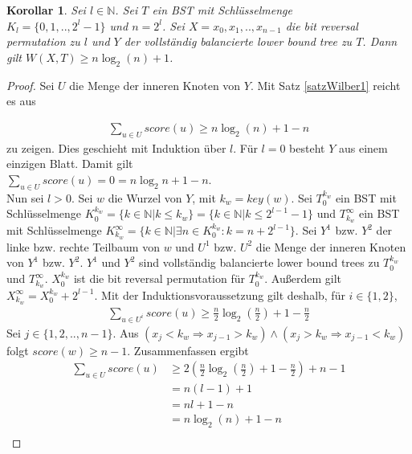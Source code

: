 \documentclass[a4paper,12pt]{article}
\begin{document}
\newtheorem{Korollar1}{Korollar}[section]
\begin{Korollar1} Sei $l \in \mathbb{N}$. Sei $T$ ein BST mit Schlüsselmenge\\ ${K_l = \{0,1,..,2^l -1\}}$ und $n = 2^l$. Sei $X = x_0, x_1,..,x_{n-1}$ die bit reversal permutation zu $l$ und $Y$ der vollständig balancierte lower bound tree zu $T$. Dann gilt  $W\left(X,T\right) \geq n \log_2 \left(n\right) + 1 $. 
\end{Korollar1}
\begin{proof}
	Sei $U$ die Menge der inneren Knoten von $Y$. Mit Satz \ref{satzWilber1} reicht es aus 
	
	\begin{align*}
	\sum_{u \in U} {\mathit{score}\left(u\right)} \geq n \log_2\left( n\right) + 1 - n 
	\end{align*} 
	zu zeigen. Dies geschieht mit Induktion über $l$. Für $l = 0$ besteht $Y$ aus einem einzigen Blatt. Damit gilt\\ $ \sum_{u \in U} {\mathit{score}\left(u\right)} = 0 = n \log_2 n + 1 - n $. \\
	Nun sei $l > 0$. Sei $w$ die Wurzel von $Y$, mit $k_w = \mathit{key}(w)$. Sei $T_0^{k_w}$ ein BST mit Schlüsselmenge $K_0^{k_w} =\{k \in \mathbb{N}\vert k \leq k_w\} = \{k \in \mathbb{N}\vert k \leq 2^{l-1} - 1\}$ und $T_{k_w}^\infty$ ein BST mit Schlüsselmenge  $ K^\infty_{k_w} = \{k \in \mathbb{N}\vert \exists n \in K_0^{k_w}\colon  k = n + 2^{l-1}\}$. Sei $Y^1$ bzw. $Y^2$ der linke bzw. rechte Teilbaum von $w$ und $U^1$ bzw. $U^2$ die Menge der inneren Knoten von $Y^1$ bzw. $Y^2$. $Y^1$ und $Y^2$ sind vollständig balancierte lower bound trees zu $T_0^{k_w}$ und $T_{k_w}^\infty$. $X^{k_w}_0$ ist die bit reversal permutation für $T_0^{k_w}$. Außerdem gilt $X_{k_w}^\infty = X^{k_w}_0 + 2^{l-1}$. Mit der Induktionsvoraussetzung gilt deshalb, für $i \in \{1,2\}$,
	\begin{align*}
	\sum_{u \in U^i} {\mathit{score}\left(u\right)} \geq  \frac{n}{2} \log_2 \left(\frac{n}{2} \right) + 1 - \frac{n}{2}  
	\end{align*}
	Sei $j \in \{1, 2,.., n-1\}$. Aus $\left(x_j < k_w \Rightarrow x_{j-1} > k_w \right) \land \left(x_j > k_w \Rightarrow x_{j-1} < k_w \right)$ folgt $\mathit{score}\left(w\right) \geq n-1$. Zusammenfassen ergibt
	\begin{align*}
	\sum_{u \in U} {\mathit{score}\left(u\right)} &\geq 2 \left( \frac{n}{2}  \log_2 \left(\frac{n}{2} \right) + 1 - \frac{n}{2} \right) + n - 1\\	
	&= n (l-1)  + 1 \\	
	&= n l + 1 -n \\
	&= n \log_2\left( n\right) + 1 - n\\	
	\end{align*}
	
\end{proof}
\end{document}
